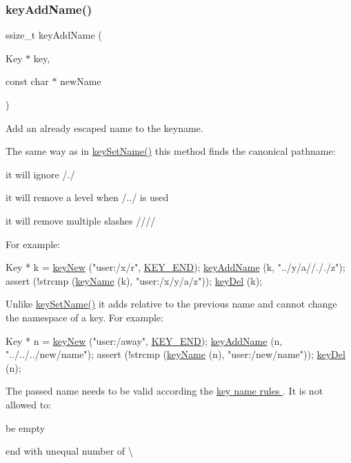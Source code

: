 \subsubsection{\texorpdfstring{key\+Add\+Name()}{keyAddName()}}
{\footnotesize\ttfamily ssize\+\_\+t key\+Add\+Name (\begin{DoxyParamCaption}\item[{Key $\ast$}]{key,  }\item[{const char $\ast$}]{new\+Name }\end{DoxyParamCaption})}



Add an already escaped name to the keyname. 

The same way as in \hyperlink{group__keyname_ga7699091610e7f3f43d2949514a4b35d9}{key\+Set\+Name()} this method finds the canonical pathname\+:
\begin{DoxyItemize}
\item it will ignore /./
\item it will remove a level when /../ is used
\item it will remove multiple slashes ////
\end{DoxyItemize}

For example\+: 
\begin{DoxyCodeInclude}
Key * k = \hyperlink{group__key_gad23c65b44bf48d773759e1f9a4d43b89}{keyNew} (\textcolor{stringliteral}{"user:/x/r"}, \hyperlink{group__key_gga9b703ca49f48b482def322b77d3e6bc8aa8adb6fcb92dec58fb19410eacfdd403}{KEY\_END});
\hyperlink{group__keyname_gaa70593a2c772c4b7bc33423b9b10a270}{keyAddName} (k, \textcolor{stringliteral}{"../y/a//././z"});
assert (!strcmp (\hyperlink{group__keyname_ga8e805c726a60da921d3736cda7813513}{keyName} (k), \textcolor{stringliteral}{"user:/x/y/a/z"}));
\hyperlink{group__key_ga3df95bbc2494e3e6703ece5639be5bb1}{keyDel} (k);
\end{DoxyCodeInclude}
 Unlike \hyperlink{group__keyname_ga7699091610e7f3f43d2949514a4b35d9}{key\+Set\+Name()} it adds relative to the previous name and cannot change the namespace of a key. For example\+: 
\begin{DoxyCodeInclude}
Key * n = \hyperlink{group__key_gad23c65b44bf48d773759e1f9a4d43b89}{keyNew} (\textcolor{stringliteral}{"user:/away"}, \hyperlink{group__key_gga9b703ca49f48b482def322b77d3e6bc8aa8adb6fcb92dec58fb19410eacfdd403}{KEY\_END});
\hyperlink{group__keyname_gaa70593a2c772c4b7bc33423b9b10a270}{keyAddName} (n, \textcolor{stringliteral}{"../../../new/name"});
assert (!strcmp (\hyperlink{group__keyname_ga8e805c726a60da921d3736cda7813513}{keyName} (n), \textcolor{stringliteral}{"user:/new/name"}));
\hyperlink{group__key_ga3df95bbc2494e3e6703ece5639be5bb1}{keyDel} (n);
\end{DoxyCodeInclude}
 The passed name needs to be valid according the \hyperlink{group__keyname}{key name rules }. It is not allowed to\+:
\begin{DoxyItemize}
\item be empty
\item end with unequal number of \textbackslash{}
\end{DoxyItemize}


